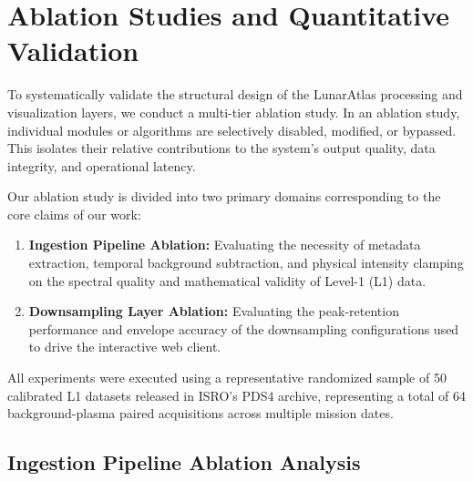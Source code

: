 
\section{Ablation Studies and Quantitative Validation}
\label{sec:ablation}

To systematically validate the structural design of the LunarAtlas processing and visualization layers, we conduct a multi-tier ablation study. In an ablation study, individual modules or algorithms are selectively disabled, modified, or bypassed. This isolates their relative contributions to the system's output quality, data integrity, and operational latency.

Our ablation study is divided into two primary domains corresponding to the core claims of our work:
\begin{enumerate}
    \item \textbf{Ingestion Pipeline Ablation:} Evaluating the necessity of metadata extraction, temporal background subtraction, and physical intensity clamping on the spectral quality and mathematical validity of Level-1 (L1) data.
    \item \textbf{Downsampling Layer Ablation:} Evaluating the peak-retention performance and envelope accuracy of the downsampling configurations used to drive the interactive web client.
\end{enumerate}

All experiments were executed using a representative randomized sample of 50 calibrated L1 datasets released in ISRO's PDS4 archive, representing a total of 64 background-plasma paired acquisitions across multiple mission dates.

\subsection{Ingestion Pipeline Ablation Analysis}

